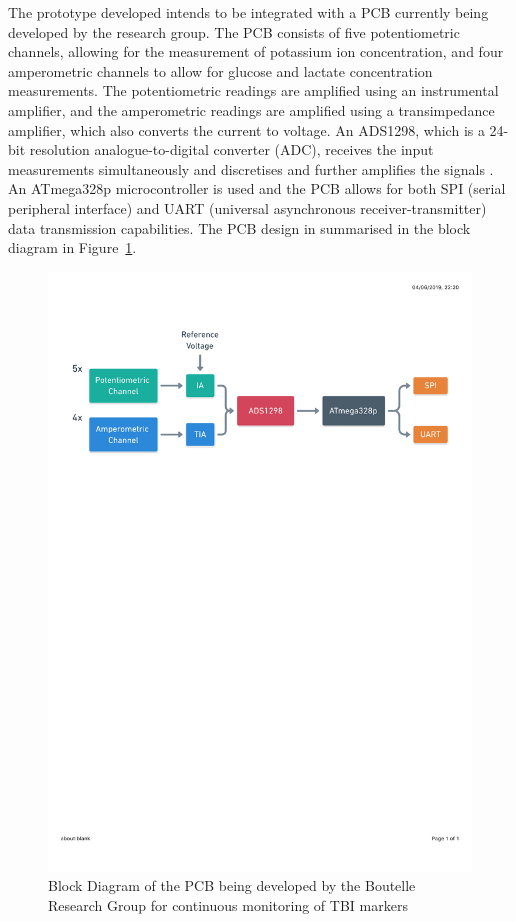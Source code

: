 The prototype developed intends to be integrated with a PCB currently being developed by the research group. The PCB consists of five potentiometric channels, allowing for the measurement of potassium ion concentration, and four amperometric channels to allow for glucose and lactate concentration measurements. The potentiometric readings are amplified using an instrumental amplifier, and the amperometric readings are amplified using a transimpedance amplifier, which also converts the current to voltage. An ADS1298, which is a 24-bit resolution analogue-to-digital converter (ADC), receives the input measurements simultaneously and discretises and further amplifies the signals \cite{TexasInstruments2010}. An ATmega328p microcontroller is used and the PCB allows for both SPI (serial peripheral interface) and UART (universal asynchronous receiver-transmitter) data transmission capabilities. The PCB design in summarised in the block diagram in Figure~\ref{fig: PCB block diagram}.

\begin{figure}[h!]
\centering
\includegraphics[trim={0cm 20.5cm 0.5cm  2.9cm}, clip, width=1\textwidth]{./figures/CircuitBlockDiagram.pdf}
\captionsetup{justification=centering}
\caption{Block Diagram of the PCB being developed by the Boutelle Research Group for continuous monitoring of TBI markers}
\label{fig: PCB block diagram}
\end{figure}

